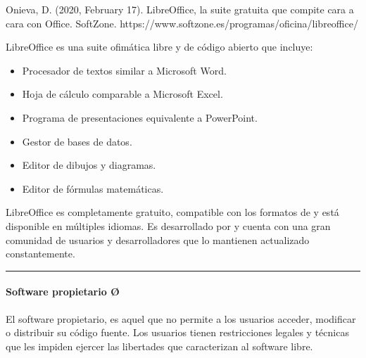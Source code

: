 \documentclass[letterpaper,10pt,spanish]{sphinxmanual}
\begin{document}
\sphinxAtStartPar
%
\begin{footnote}[10]\sphinxAtStartFootnote
Onieva, D. (2020, February 17). LibreOffice, la suite gratuita que compite cara a cara con Office. SoftZone. https://www.softzone.es/programas/oficina/libreoffice/
%
\end{footnote} LibreOffice es una suite ofimática libre y de código abierto que incluye:
\begin{itemize}
\item {} 
\sphinxAtStartPar
{} Procesador de textos similar a Microsoft Word.

\item {} 
\sphinxAtStartPar
{} Hoja de cálculo comparable a Microsoft Excel.

\item {} 
\sphinxAtStartPar
{} Programa de presentaciones equivalente a PowerPoint.

\item {} 
\sphinxAtStartPar
{} Gestor de bases de datos.

\item {} 
\sphinxAtStartPar
{} Editor de dibujos y diagramas.

\item {} 
\sphinxAtStartPar
{} Editor de fórmulas matemáticas.

\end{itemize}

\sphinxAtStartPar
LibreOffice es completamente gratuito, compatible con los formatos de  y está disponible en múltiples idiomas. Es desarrollado por  y cuenta con una gran comunidad de usuarios y desarrolladores que lo mantienen actualizado constantemente.


\bigskip\hrule\bigskip



\paragraph{Software propietario Ø}
\label{\detokenize{cursos/ofimatica10/recursos/T02:software-propietario-o}}
\sphinxAtStartPar
\sphinxfootnotemark[2] El software propietario, es aquel que no permite a los usuarios acceder, modificar o distribuir su código fuente. Los usuarios tienen restricciones legales y técnicas que les impiden ejercer las libertades que caracterizan al software libre.
\end{document}
